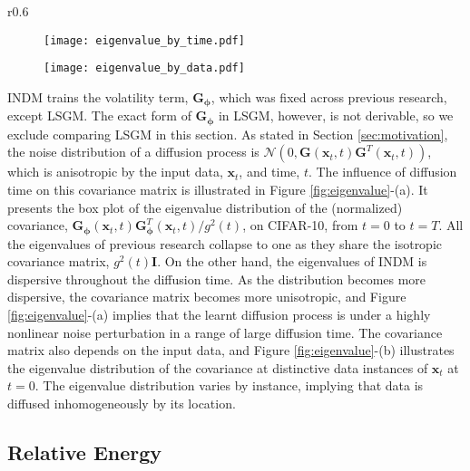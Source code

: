 \documentclass{article}
\theoremstyle{definition}
\theoremstyle{remark}
\begin{document}
	\begin{wrapfigure}{r}{0.6\textwidth}
		\vskip -0.2in	
		\begin{subfigure}{0.48\linewidth}
			\texttt{[image: eigenvalue\_by\_time.pdf]}
		\end{subfigure}
		\begin{subfigure}{0.48\linewidth}
			\texttt{[image: eigenvalue\_by\_data.pdf]}
		\end{subfigure}
		\vskip -0.05in
		\caption{Eigenvalue of $\mathbf{G}\mathbf{G}^{T}/g^{2}$ on CIFAR-10.}
		\label{fig:eigenvalue}
		\vskip -0.15in
	\end{wrapfigure}
	INDM trains the volatility term, $\mathbf{G}_{\bm{\phi}}$, which was fixed across previous research, except LSGM. The exact form of $\mathbf{G}_{\bm{\phi}}$ in LSGM, however, is not derivable, so we exclude comparing LSGM in this section. As stated in Section \ref{sec:motivation}, the noise distribution of a diffusion process is $\mathcal{N}(0,\mathbf{G}(\mathbf{x}_{t},t)\mathbf{G}^{T}(\mathbf{x}_{t},t))$, which is anisotropic by the input data, $\mathbf{x}_{t}$, and time, $t$. The influence of diffusion time on this covariance matrix is illustrated in Figure \ref{fig:eigenvalue}-(a). It presents the box plot of the eigenvalue distribution of the (normalized) covariance, $\mathbf{G}_{\bm{\phi}}(\mathbf{x}_{t},t)\mathbf{G}_{\bm{\phi}}^{T}(\mathbf{x}_{t},t)/g^{2}(t)$, on CIFAR-10, from $t=0$ to $t=T$. All the eigenvalues of previous research collapse to one as they share the isotropic covariance matrix, $g^{2}(t)\mathbf{I}$. On the other hand, the eigenvalues of INDM is dispersive throughout the diffusion time. As the distribution becomes more dispersive, the covariance matrix becomes more unisotropic, and Figure \ref{fig:eigenvalue}-(a) implies that the learnt diffusion process is under a highly nonlinear noise perturbation in a range of large diffusion time. The covariance matrix also depends on the input data, and Figure \ref{fig:eigenvalue}-(b) illustrates the eigenvalue distribution of the covariance at distinctive data instances of $\mathbf{x}_{t}$ at $t=0$. The eigenvalue distribution varies by instance, implying that data is diffused inhomogeneously by its location.
	
	\subsection{Relative Energy}\label{appendix:admissibility}
	
\end{document}
